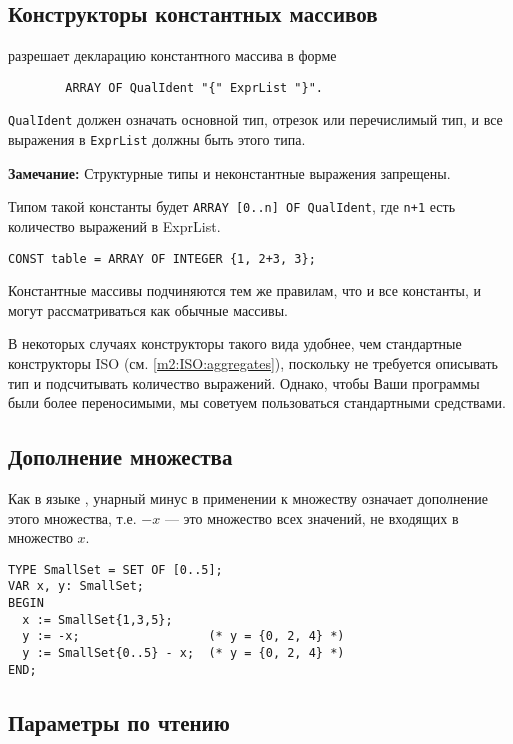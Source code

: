 \subsection{Конструкторы константных массивов}\label{m2:constarrays}
\mextonly

\xds{} разрешает декларацию константного массива в форме
\begin{verbatim}
        ARRAY OF QualIdent "{" ExprList "}".
\end{verbatim}
{\tt QualIdent} должен означать основной тип, отрезок или перечислимый
тип, и все выражения в
{\tt ExprList} должны быть этого типа.

{\bf Замечание:} Структурные типы и неконстантные выражения запрещены.

Типом такой константы будет \verb|ARRAY [0..n] OF QualIdent|,
где \verb|n+1| есть количество выражений в ExprList.
\Example
\begin{verbatim}
CONST table = ARRAY OF INTEGER {1, 2+3, 3};
\end{verbatim}

Константные массивы подчиняются тем же правилам, что и все константы,
и могут рассматриваться как обычные массивы.

В некоторых случаях конструкторы такого вида удобнее, чем стандартные
конструкторы ISO (см. \ref{m2:ISO:aggregates}),
поскольку не требуется описывать тип и подсчитывать количество
выражений. Однако, чтобы Ваши программы были более переносимыми,
мы советуем пользоваться стандартными средствами.

\subsection{Дополнение множества}

\mextonly

Как в языке \ot{}, унарный минус в применении к множеству означает
дополнение этого множества, т.е.
$-x$ --- это множество всех значений, не входящих в множество $x$.

\begin{verbatim}
TYPE SmallSet = SET OF [0..5];
VAR x, y: SmallSet;
BEGIN
  x := SmallSet{1,3,5};
  y := -x;                  (* y = {0, 2, 4} *)
  y := SmallSet{0..5} - x;  (* y = {0, 2, 4} *)
END;
\end{verbatim}

\subsection{Параметры по чтению}\label{m2:ext:RO_param}

